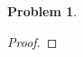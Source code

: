 \documentclass[a4paper]{article}
\newtheorem{problem}{Problem}
\begin{document}
\rhead{\today}

\begin{problem}
    
\end{problem}
\begin{proof}
    
\end{proof}
\end{document}
